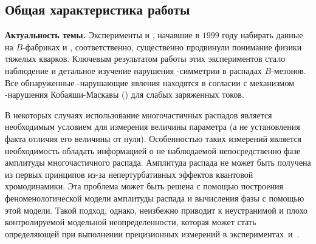 \subsection*{Общая характеристика работы}

\newcommand{\actuality}{{\textbf{Актуальность темы.}}}
\newcommand{\aim}{{\textbf{Целью}}}
\newcommand{\tasks}{{\textbf{задачи}}}
\newcommand{\defpositions}{{\textbf{Основные положения, выносимые на~защиту:}}}
\newcommand{\novelty}{{\textbf{Научная новизна:}}}
\newcommand{\influence}{{\textbf{Практическая значимость}}}
\newcommand{\reliability}{{\textbf{Достоверность}}}
\newcommand{\probation}{{\textbf{Апробация работы.}}}
\newcommand{\contribution}{{\textbf{Личный вклад.}}}
\newcommand{\publications}{{\textbf{Публикации.}}}


{\actuality} Эксперименты \belle и \babar, начавшие в $1999$ году набирать данные на $B$-фабриках \kekb и \pepii, соответственно, существенно продвинули понимание физики тяжелых кварков.  Ключевым результатом работы этих экспериментов стало наблюдение и детальное изучение нарушения \cpconj-симметрии в распадах $B$-мезонов.  Все обнаруженные \cpconj-нарушающие явления находятся в согласии с механизмом \cpconj-нарушения Кобаяши-Маскавы (\km) для слабых заряженных токов.

В некоторых случаях использование многочастичных распадов является необходимым условием для измерения величины параметра (а не установления факта отличия его величины от нуля).  Особенностью таких измерений является необходимость обладать информацией о не наблюдаемой непосредственно фазе амплитуды многочастичного распада.  Амплитуда распада не может быть получена из первых принципов из-за непертурбативных эффектов квантовой хромодинамики.  Эта проблема может быть решена с помощью построения феноменологической модели амплитуды распада и вычисления фазы с помощью этой модели.  
Такой подход, однако, неизбежно приводит к неустранимой и плохо контролируемой модельной неопределенности, которая может стать определяющей при выполнении прецизионных измерений в экспериментах~\lhcb и~\belleii.

